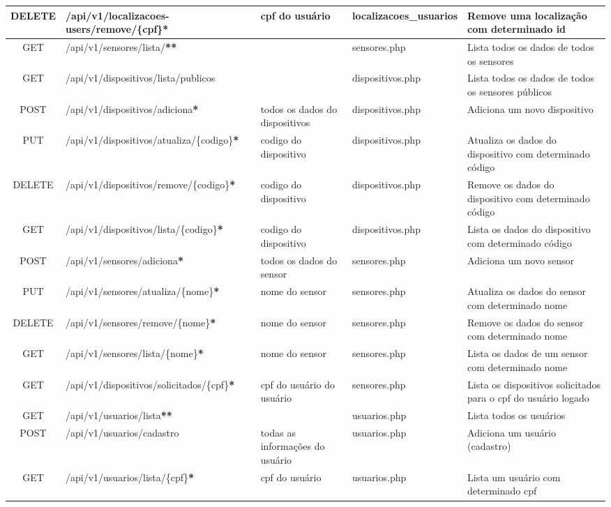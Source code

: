 \documentclass[tcc,capa]{texufpel}
\begin{document}
\begin{table}[h]
{\begin{tabular}{|c|l|l|l|p{7cm}|}
\hline
DELETE & /api/v1/localizacoes-users/remove/\{cpf\}\textbf{*} & cpf do usuário & localizacoes\_usuarios & Remove uma localização com determinado id \\
\hline
GET & /api/v1/sensores/lista/\textbf{**} & & sensores.php & Lista todos os dados de todos os sensores\\
\hline
GET & /api/v1/dispositivos/lista/publicos & & dispositivos.php & Lista todos os dados de todos os sensores públicos\\
\hline
POST & /api/v1/dispositivos/adiciona\textbf{*} & todos os dados do dispositivos & dispositivos.php & Adiciona um novo dispositivo\\
\hline
PUT & /api/v1/dispositivos/atualiza/\{codigo\}\textbf{*} & codigo do dispositivo & dispositivos.php & Atualiza os dados do dispositivo com determinado código\\
\hline
DELETE & /api/v1/dispositivos/remove/\{codigo\}\textbf{*} & codigo do dispositivo & dispositivos.php & Remove os dados do dispositivo com determinado código\\
\hline
GET & /api/v1/dispositivos/lista/\{codigo\}\textbf{*} & codigo do dispositivo & dispositivos.php & Lista os dados do dispositivo com determinado código\\
\hline
POST & /api/v1/sensores/adiciona\textbf{*} & todos os dados do sensor & sensores.php & Adiciona um novo sensor\\
\hline
PUT & /api/v1/sensores/atualiza/\{nome\}\textbf{*} & nome do sensor & sensores.php & Atualiza os dados do sensor com determinado nome\\
\hline
DELETE & /api/v1/sensores/remove/\{nome\}\textbf{*} & nome do sensor & sensores.php & Remove os dados do sensor com determinado nome\\
\hline
GET & /api/v1/sensores/lista/\{nome\}\textbf{*} & nome do sensor & sensores.php & Lista os dados de um sensor com determinado nome\\
\hline
GET & /api/v1/dispositivos/solicitados/\{cpf\}\textbf{*} & cpf do usuário do usuário & sensores.php & Lista os dispositivos solicitados para o cpf do usuário logado\\
\hline
GET & /api/v1/usuarios/lista\textbf{**} &  & usuarios.php & Lista todos os usuários\\
\hline
POST & /api/v1/usuarios/cadastro & todas as informações do usuário & usuarios.php & Adiciona um usuário (cadastro)\\
\hline
GET & /api/v1/usuarios/lista/\{cpf\}\textbf{*} & cpf do usuário & usuarios.php & Lista um usuário com determinado cpf\\

\end{tabular}}
\end{table}
\end{document}
